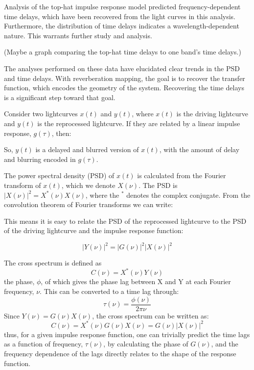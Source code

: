 \documentclass[11pt,letterpaper]{article}
\begin{document}
Analysis of the top-hat impulse response model predicted frequency-dependent time delays, which have been recovered from the light curves in this analysis. Furthermore, the distribution of time delays indicates a wavelength-dependent nature. This warrants further study and analysis.

(Maybe a graph comparing the top-hat time delays to one band's time delays.)

The analyses performed on these data have elucidated clear trends in the PSD and time delays. With reverberation mapping, the goal is to recover the transfer function, which encodes the geometry of the system. Recovering the time delays is a significant step toward that goal.








Consider two lightcurves $x(t)$ and $y(t)$, where $x(t)$ is the driving lightcurve and $y(t)$ is the reprocessed lightcurve.  If they are related by a linear impulse response, $g(\tau)$, then: 









So, $y(t)$ is a delayed and blurred version of $x(t)$, with the amount of delay and blurring encoded in $g(\tau)$.

The power spectral density (PSD) of $x(t)$ is calculated from the Fourier transform of $x(t)$, which we denote $X(\nu)$.  The PSD is $|X(\nu)|^2 = X^*(\nu)X(\nu)$, where the $^*$ denotes the complex conjugate.  From the convolution theorem of Fourier transforms we can write:



This means it is easy to relate the PSD of the reprocessed lightcurve to the PSD of the driving lightcurve and the impulse response function:

\begin{equation}
|Y(\nu)|^2 = |G(\nu)|^2 |X(\nu)|^2
\end{equation}

The cross spectrum is defined as
\begin{equation}
C(\nu) = X^*(\nu) Y(\nu)
\end{equation}
the phase, $\phi$, of which gives the phase lag between X and Y at each Fourier frequency, $\nu$.  This can be converted to a time lag through: 
\begin{equation}
\tau(\nu) = \frac{\phi(\nu)}{2\pi\nu}
\end{equation}
Since $Y(\nu) = G(\nu) X(\nu)$,  the cross spectrum can be written as:
\begin{equation}
C(\nu) = X^*(\nu) G(\nu) X(\nu) =  G(\nu) |X(\nu)|^2 
\end{equation}
thus, for a given impulse response function, one can trivially predict the time lags as a function of frequency, $\tau(\nu)$, by calculating the phase of $G(\nu)$, and the frequency dependence of the lags directly relates to the shape of the response function.
\end{document}
